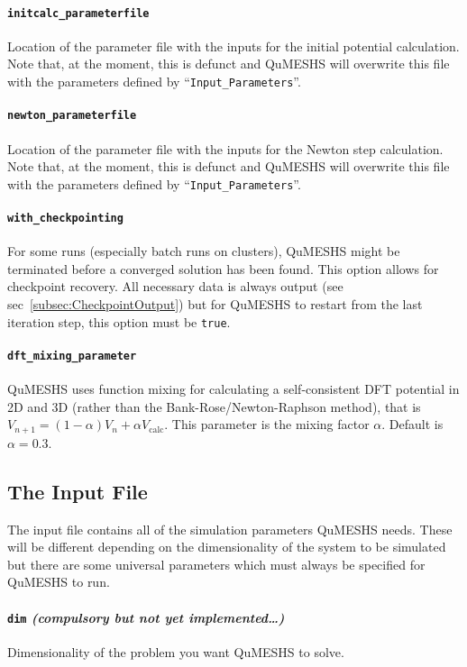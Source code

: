 \documentclass[12pt]{article}
\begin{document}
\paragraph{\texttt{initcalc\_parameterfile}}
Location of the parameter file with the inputs for the initial potential
calculation.  Note that, at the moment, this is defunct and QuMESHS will
overwrite this file with the parameters defined by ``\texttt{Input\_Parameters}''.

\paragraph{\texttt{newton\_parameterfile}}
Location of the parameter file with the inputs for the Newton step
calculation.  Note that, at the moment, this is defunct and QuMESHS will
overwrite this file with the parameters defined by ``\texttt{Input\_Parameters}''.

\paragraph{\texttt{with\_checkpointing}}
For some runs (especially batch runs on clusters), QuMESHS might be terminated
before a converged solution has been found.  This option allows for checkpoint
recovery.  All necessary data is always output (see sec~\ref{subsec:CheckpointOutput})
but for QuMESHS to restart from the last iteration step, this option must be
\texttt{true}.

\paragraph{\texttt{dft\_mixing\_parameter}}
QuMESHS uses function mixing for calculating a self-consistent DFT potential
in 2D and 3D (rather than the Bank-Rose/Newton-Raphson method), that is
$V_{n+1} = (1 - \alpha) V_{n} + \alpha V_{\mathrm{calc}}$.  This parameter is
the mixing factor $\alpha$.  Default is $\alpha = 0.3$.


\subsection{The Input File}
\label{subsec:InputFile}

The input file contains all of the simulation parameters QuMESHS needs.  These will
be different depending on the dimensionality of the system to be simulated but there
are some universal parameters which must always be specified for QuMESHS to run.

\paragraph{\texttt{dim} \emph{(compulsory but not yet implemented\ldots)}}
Dimensionality of the problem you want QuMESHS to solve.
\end{document}
